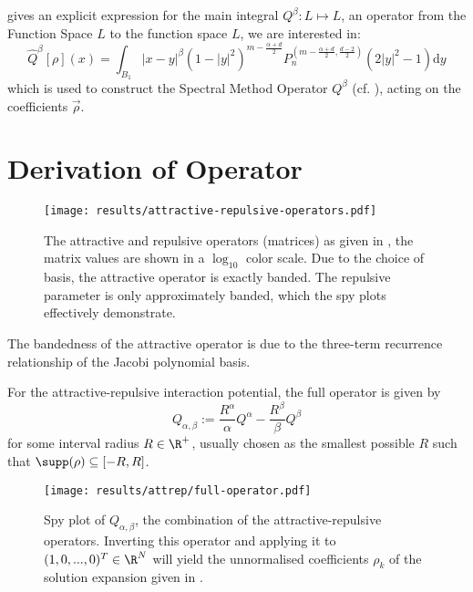  gives an explicit expression for the main integral
\(Q^{\beta}: L \mapsto L\), an operator from the Function Space \(L\) to the function space \(L\), we are interested in:
\[\hat{Q}^{\beta}[\rho](x) = \int_{B_1} |x-y|^\beta (1-|y|^2)^{m-\frac{\alpha+d}{2}} P_n^{(m-
  \frac{\alpha+d}{2},\frac{d-2}{2})}(2|y|^2-1) \mathrm{d}y\] which is used
to construct the Spectral Method Operator \(Q^\beta\) (cf. ), acting on the coefficients \(\vec{\rho}\).

\section{Derivation of Operator}


\begin{figure}[H]
  \centering
  \label{fig:attractive-repulsive}
  \texttt{[image: results/attractive-repulsive-operators.pdf]}
  \caption[Attractive and repulsive operators.]{The attractive and repulsive operators (matrices) as given in , the matrix values are shown in a $\log_{10}$ color scale. Due to the choice of basis, the attractive operator is exactly banded. The repulsive parameter is only approximately banded, which the spy plots effectively demonstrate.}
\end{figure}

The bandedness of the attractive operator is due to the three-term recurrence relationship of the Jacobi polynomial basis.

For the attractive-repulsive interaction potential, the full operator is given by
\begin{equation}
  Q_{\alpha, \beta} := \frac{R^\alpha}{\alpha} Q^\alpha - \frac{R^\beta}{\beta} Q^\beta
  \label{eq:full-attrep-operator}
\end{equation}
for some interval radius $R \in \R^+$, usually chosen as the smallest possible $R$ such that $\supp(\rho) \subseteq [-R, R]$.

\begin{figure}[H]
  \centering
  \label{fig:attrep-operator}
  \texttt{[image: results/attrep/full-operator.pdf]}
  \caption[Combination of the attractive-repulsive operators]{Spy plot of $Q_{\alpha, \beta}$, the combination of the attractive-repulsive operators. Inverting this operator and applying it to $(1, 0, ..., 0)^T \in \R^N$ will yield the unnormalised coefficients $\rho_k$ of the solution expansion given in .}
\end{figure}

